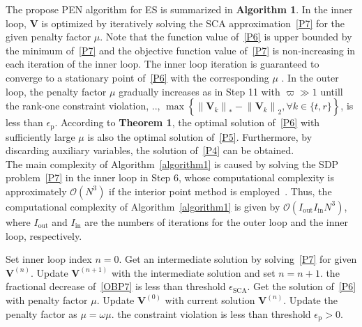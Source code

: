 \documentclass[12pt, draftclsnofoot, onecolumn]{IEEEtran}
\newcommand{\ie}{\text{i}.\text{e}.}
\begin{document}
The propose PEN algorithm for ES is summarized in \textbf{Algorithm 1}. In the inner loop, $\mathbf{V}$ is optimized by iteratively solving the SCA approximation~\eqref{P7} for the given penalty factor $\mu$. 
Note that the function value of~\eqref{P6} is upper bounded by the minimum of~\eqref{P7} and the objective function value of~\eqref{P7} is non-increasing in each iteration of the inner loop. The inner loop iteration is guaranteed to converge to a stationary point of~\eqref{P6} with the corresponding $\mu$ \cite{dinh2010local}. In the outer loop, the penalty factor $\mu$ gradually increases as in Step 11 with $\varpi\gg 1$ untill the rank-one constraint violation, \ie, $\max\left\{\left\|{\mathbf{V}}_k\right\|_*-\left\|{\mathbf{V}}_k\right\|_2, \forall k \in\{t,r\}\right\}$, is less than $\epsilon_{\text{p}}$. According to \textbf{Theorem 1}, the optimal solution of~\eqref{P6} with sufficiently large $\mu$ is also the optimal solution of~\eqref{P5}. Furthermore, by discarding auxiliary variables, the solution of~\eqref{P4} can be obtained.\\
\indent The main complexity of Algorithm~\ref{algorithm1} is caused by solving the SDP problem~\eqref{P7} in the inner loop in Step 6, whose computational complexity is approximately $\mathcal{O}\left(N^{3}\right)$ if the interior point method is employed~\cite{bomze2010interior}. Thus, the computational complexity of Algorithm~\ref{algorithm1} is given by $\mathcal{O}\left({I}_\text{out} {I}_\text{in} N^3\right)$, where ${I}_\text{out}$ and ${I}_\text{in}$ are the numbers of iterations for the outer loop and the inner loop, respectively.
\begin{algorithm}[htbp]
\caption{Proposed PEN Algorithm for ES}\label{algorithm1}
\begin{algorithmic}[1]
\STATE \quad Set inner loop index $n = 0$.
\STATE {}
\STATE \quad\quad Get an intermediate solution by solving~\eqref{P7} for given $\mathbf{V}^{(n)}$.
\STATE \quad\quad Update $\mathbf{V}^{(n+1)}$ with the intermediate solution and set $n=n+1$.
\STATE {} the fractional decrease of~\eqref{OBP7} is less than threshold $\epsilon_{\text{SCA}}$.
\STATE \quad Get the solution of~\eqref{P6} with penalty factor $\mu$.
\STATE \quad Update $\mathbf{V}^{(0)}$ with current solution $\mathbf{V}^{(n)}$.
\STATE \quad Update the penalty factor as $\mu=\omega\mu$.
 the constraint violation is less than threshold $\epsilon_{\text{p}} >0$.
\end{algorithmic}
\end{algorithm}
\end{document}
